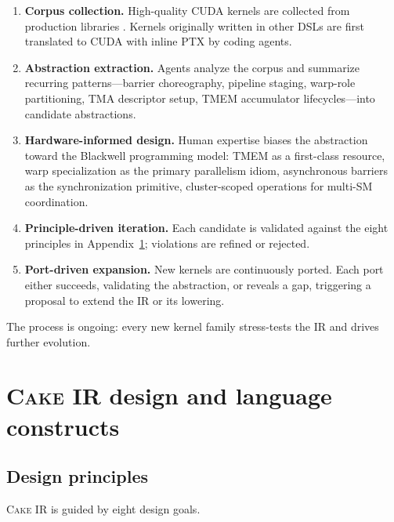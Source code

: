 \documentclass[11pt]{article}
\newcommand{\cakeir}{\textsc{Cake IR}}
\begin{document}
\begin{enumerate}
  \item \textbf{Corpus collection.} High-quality CUDA kernels are collected from
  production libraries \cite{alpha_moe2025,cutlass,bentz2025cutile,
  deepgemm2025,zadouri2026flashattention4algorithmkernelpipelining,
  Yangetal2026FlashKMeans,flashinfer,guo2025sonicmoeacceleratingmoeio,
  ye2025tilelang}. Kernels originally written in other DSLs are first translated
  to CUDA with inline PTX by coding agents.
  \item \textbf{Abstraction extraction.} Agents analyze the corpus and summarize
  recurring patterns---barrier choreography, pipeline staging, warp-role
  partitioning, TMA descriptor setup, TMEM accumulator lifecycles---into
  candidate abstractions.
  \item \textbf{Hardware-informed design.} Human expertise biases the
  abstraction toward the Blackwell programming model: TMEM as a first-class
  resource, warp specialization as the primary parallelism idiom, asynchronous
  barriers as the synchronization primitive, cluster-scoped operations for
  multi-SM coordination.
  \item \textbf{Principle-driven iteration.} Each candidate is validated against
  the eight principles in Appendix~\ref{app:cake-ir}; violations are refined or
  rejected.
  \item \textbf{Port-driven expansion.} New kernels are continuously ported.
  Each port either succeeds, validating the abstraction, or reveals a gap,
  triggering a proposal to extend the IR or its lowering.
\end{enumerate}

The process is ongoing: every new kernel family stress-tests the IR and drives
further evolution.

\section{\cakeir{} design and language constructs}
\label{app:cake-ir}

\subsection{Design principles}

\cakeir{} is guided by eight design goals.
\end{document}
